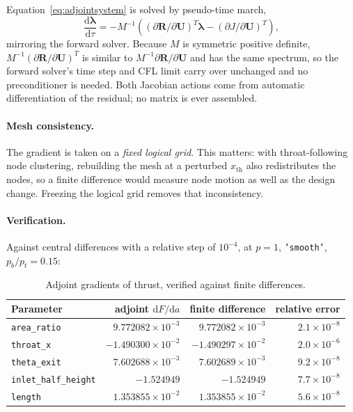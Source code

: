\documentclass[11pt,a4paper]{article}
\newcommand{\vect}[1]{\boldsymbol{#1}}
\newcommand{\Uvec}{\vect{U}}
\newcommand{\code}[1]{\texttt{#1}}
\begin{document}
Equation~\eqref{eq:adjointsystem} is solved by pseudo-time march,
\begin{equation}
  \frac{\mathrm{d}\vect{\lambda}}{\mathrm{d}\tau}
  = -M^{-1}\left(
      \left(\partial \vect{R}/\partial \Uvec\right)^{T}\vect{\lambda}
      - \left(\partial J/\partial \Uvec\right)^{T}\right),
\end{equation}
mirroring the forward solver.  Because $M$ is symmetric positive definite,
$M^{-1}(\partial\vect{R}/\partial\Uvec)^{T}$ is similar to
$M^{-1}\partial\vect{R}/\partial\Uvec$ and has the same spectrum, so the forward
solver's time step and CFL limit carry over unchanged and no preconditioner is
needed.  Both Jacobian actions come from automatic differentiation of the
residual; no matrix is ever assembled.

\paragraph{Mesh consistency.}  The gradient is taken on a \emph{fixed logical
grid}.  This matters: with throat-following node clustering, rebuilding the mesh
at a perturbed $x_{\mathrm{th}}$ also redistributes the nodes, so a finite
difference would measure node motion as well as the design change.  Freezing the
logical grid removes that inconsistency.

\paragraph{Verification.}  Against central differences with a relative step of
$10^{-4}$, at $p=1$, \code{'smooth'}, $p_b/p_t = 0.15$:

\begin{table}[H]
  \centering
  \small
  \begin{tabular}{lrrr}
    \toprule
    Parameter & adjoint $\mathrm{d}F/\mathrm{d}a$ & finite difference & relative error \\
    \midrule
    \code{area\_ratio}        & $9.772082\times10^{-3}$  & $9.772082\times10^{-3}$  & $2.1\times10^{-8}$ \\
    \code{throat\_x}          & $-1.490300\times10^{-2}$ & $-1.490297\times10^{-2}$ & $2.0\times10^{-6}$ \\
    \code{theta\_exit}        & $7.602688\times10^{-3}$  & $7.602689\times10^{-3}$  & $9.2\times10^{-8}$ \\
    \code{inlet\_half\_height}& $-1.524949$              & $-1.524949$              & $7.7\times10^{-8}$ \\
    \code{length}             & $1.353855\times10^{-2}$  & $1.353855\times10^{-2}$  & $5.6\times10^{-8}$ \\
    \bottomrule
  \end{tabular}
  \caption{Adjoint gradients of thrust, verified against finite differences.}
  \label{tab:gradcheck}
\end{table}
\end{document}
